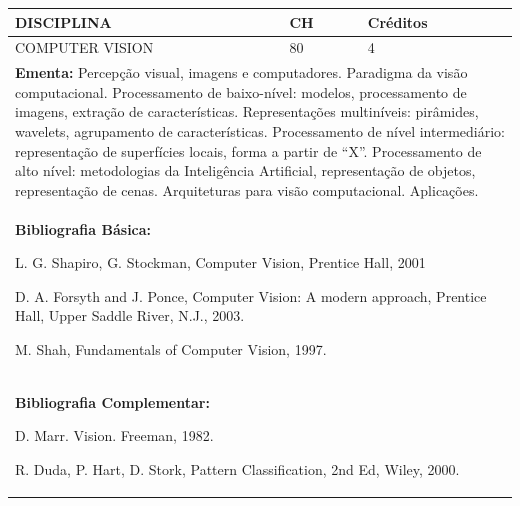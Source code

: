 \documentclass[a4paper, 12pt, openright, oneside, german, french, english, brazil]{abntex2}
\begin{document}
\begin{table}[!h]
  \footnotesize
  \centering
  \begin{tabular}{|p{100mm}|p{10mm}|p{20mm}|}
    \hline
    \textbf{DISCIPLINA} & \textbf{CH} & \textbf{Créditos} \\
    \hline
    COMPUTER VISION  & 80 & 4 \\
    \hline
    \multicolumn{3}{|p{130mm}|}{\textbf{Ementa:}  Percepção visual, imagens e computadores. Paradigma da visão computacional. Processamento de baixo-nível: modelos, processamento de imagens, extração de características. Representações multiníveis: pirâmides, wavelets, agrupamento de características. Processamento de nível intermediário: representação de superfícies locais, forma a partir de “X”. Processamento de alto nível: metodologias da Inteligência Artificial, representação de objetos, representação de cenas. Arquiteturas para visão computacional. Aplicações. } \\
    \hline
    \multicolumn{3}{|p{130mm}|}{\textbf{Bibliografia Básica:}

    L. G. Shapiro, G. Stockman, Computer Vision, Prentice Hall, 2001

D. A. Forsyth and J. Ponce, Computer Vision: A modern approach, Prentice Hall, Upper Saddle River, N.J., 2003.

M. Shah, Fundamentals of Computer Vision, 1997.
} \\
    \hline
    \multicolumn{3}{|p{130mm}|}{\textbf{Bibliografia Complementar:}

    D. Marr. Vision. Freeman, 1982.

R. Duda, P. Hart, D. Stork, Pattern Classification, 2nd Ed, Wiley, 2000.
} \\
    \hline
  \end{tabular}
\end{table}
\end{document}
